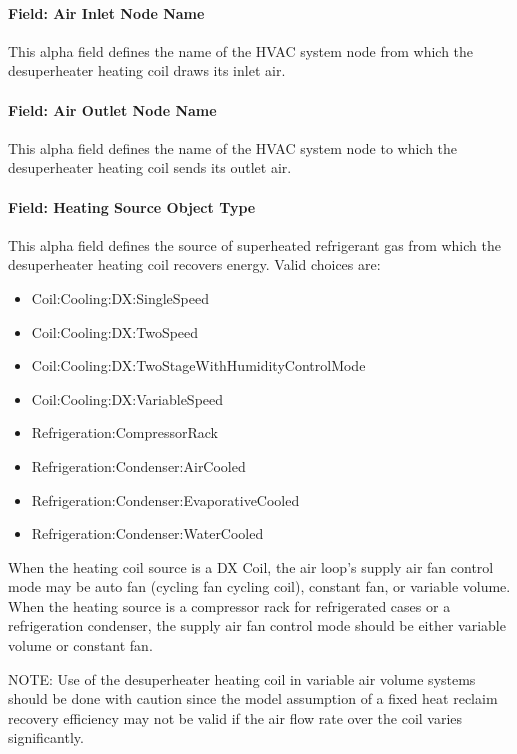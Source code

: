 \paragraph{Field: Air Inlet Node Name}\label{field-air-inlet-node-name-5-000}

This alpha field defines the name of the HVAC system node from which the desuperheater heating coil draws its inlet air.

\paragraph{Field: Air Outlet Node Name}\label{field-air-outlet-node-name-5-000}

This alpha field defines the name of the HVAC system node to which the desuperheater heating coil sends its outlet air.

\paragraph{Field: Heating Source Object Type}\label{field-heating-source-object-type}

This alpha field defines the source of superheated refrigerant gas from which the desuperheater heating coil recovers energy. Valid choices are:

\begin{itemize}
\item
  Coil:Cooling:DX:SingleSpeed
\item
  Coil:Cooling:DX:TwoSpeed
\item
  Coil:Cooling:DX:TwoStageWithHumidityControlMode
\item
  Coil:Cooling:DX:VariableSpeed
\item
  Refrigeration:CompressorRack
\item
  Refrigeration:Condenser:AirCooled
\item
  Refrigeration:Condenser:EvaporativeCooled
\item
  Refrigeration:Condenser:WaterCooled
\end{itemize}

When the heating coil source is a DX Coil, the air loop's supply air fan control mode may be auto fan (cycling fan cycling coil), constant fan, or variable volume. When the heating source is a compressor rack for refrigerated cases or a refrigeration condenser, the supply air fan control mode should be either variable volume or constant fan.

NOTE: Use of the desuperheater heating coil in variable air volume systems should be done with caution since the model assumption of a fixed heat reclaim recovery efficiency may not be valid if the air flow rate over the coil varies significantly.

